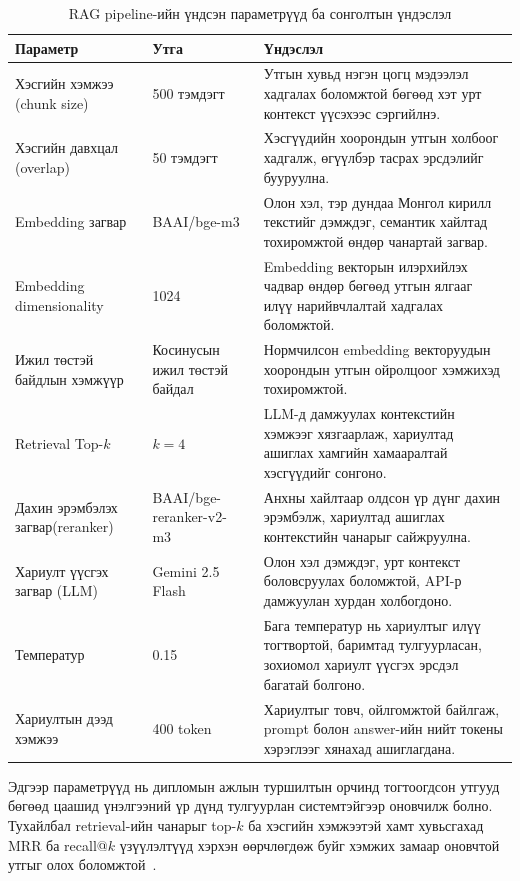 \begin{table}[H]
\centering
\begin{tabular}{|p{3.4cm}|p{2.6cm}|p{7.9cm}|}
\hline
\textbf{Параметр} & \textbf{Утга} & \textbf{Үндэслэл} \\ \hline
Хэсгийн хэмжээ (chunk size) & 500 тэмдэгт & Утгын хувьд нэгэн цогц мэдээлэл хадгалах боломжтой бөгөөд хэт урт контекст үүсэхээс сэргийлнэ. \\ \hline
Хэсгийн давхцал (overlap) & 50 тэмдэгт & Хэсгүүдийн хоорондын утгын холбоог хадгалж, өгүүлбэр тасрах эрсдэлийг бууруулна. \\ \hline
Embedding загвар & BAAI/bge-m3~\cite{bge_m3} & Олон хэл, тэр дундаа Монгол кирилл текстийг дэмждэг, семантик хайлтад тохиромжтой өндөр чанартай загвар. \\ \hline
Embedding  dimensionality & 1024 & Embedding векторын илэрхийлэх чадвар өндөр бөгөөд утгын ялгааг илүү нарийвчлалтай хадгалах боломжтой. \\ \hline
Ижил төстэй байдлын хэмжүүр & Косинусын ижил төстэй байдал & Нормчилсон embedding векторуудын хоорондын утгын ойролцоог хэмжихэд тохиромжтой.~\cite{sentence_bert} \\ \hline
Retrieval Top-$k$ & $k=4$ & LLM-д дамжуулах контекстийн хэмжээг хязгаарлаж, хариултад ашиглах хамгийн хамааралтай хэсгүүдийг сонгоно. \\ \hline
Дахин эрэмбэлэх загвар(reranker) & BAAI/bge-reranker-v2-m3~\cite{bge_reranker} & Анхны хайлтаар олдсон үр дүнг дахин эрэмбэлж, хариултад ашиглах контекстийн чанарыг сайжруулна. \\ \hline
Хариулт үүсгэх загвар
(LLM) & Gemini 2.5 Flash~\cite{gemini_report} & Олон хэл дэмждэг, урт контекст боловсруулах боломжтой, API-р дамжуулан хурдан холбогдоно. \\ \hline
Температур & 0.15 & Бага температур нь хариултыг илүү тогтвортой, баримтад тулгуурласан, зохиомол хариулт үүсгэх эрсдэл багатай болгоно. \\ \hline
Хариултын дээд хэмжээ & 400 token & Хариултыг товч, ойлгомжтой байлгаж, prompt болон answer-ийн нийт токены хэрэглээг хянахад ашиглагдана. \\ \hline
\end{tabular}
\caption[RAG pipeline-ийн үндсэн параметрүүд]{RAG pipeline-ийн үндсэн параметрүүд ба сонголтын үндэслэл}
\label{tab:rag-params}
\end{table}

Эдгээр параметрүүд нь дипломын ажлын туршилтын орчинд тогтоогдсон утгууд бөгөөд цаашид үнэлгээний үр дүнд тулгуурлан системтэйгээр оновчилж болно. Тухайлбал retrieval-ийн чанарыг top-$k$ ба хэсгийн хэмжээтэй хамт хувьсгахад MRR ба recall@$k$ үзүүлэлтүүд хэрхэн өөрчлөгдөж буйг хэмжих замаар оновчтой утгыг олох боломжтой~\cite{dpr,ragas}.

